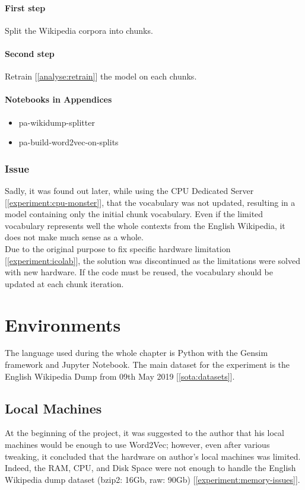 \paragraph{First step}
Split the Wikipedia corpora into chunks.

\paragraph{Second step}
Retrain [\ref{analyse:retrain}] the model on each chunks.

\paragraph{Notebooks in Appendices}
\begin{itemize}
    \setlength\itemsep{0em}
    \item pa-wikidump-splitter
    \item pa-build-word2vec-on-splits
\end{itemize}

\subsubsection{Issue}
\label{experiment:split-retrain-issue}
Sadly, it was found out later, while using the CPU Dedicated Server [\ref{experiment:cpu-monster}], that the vocabulary was not updated, resulting in a model containing only the initial chunk vocabulary. Even if the limited vocabulary represents well the whole contexts from the English Wikipedia, it does not make much sense as a whole.\\

Due to the original purpose to fix specific hardware limitation [\ref{experiment:icolab}], the solution was discontinued as the limitations were solved with new hardware. If the code must be reused, the vocabulary should be updated at each chunk iteration.


\section{Environments}
\label{experiment:environments}
The language used during the whole chapter is Python with the Gensim framework and Jupyter Notebook. The main dataset for the experiment is the English Wikipedia Dump from 09th May 2019 [\ref{sota:datasets}].

\subsection{Local Machines}
\label{experiment:local-machines}
At the beginning of the project, it was suggested to the author that his local machines would be enough to use Word2Vec; however, even after various tweaking, it concluded that the hardware on author's local machines was limited. Indeed, the RAM, CPU, and Disk Space were not enough to handle the English Wikipedia dump dataset (bzip2: 16Gb, raw: 90Gb) [\ref{experiment:memory-issues}]. 

